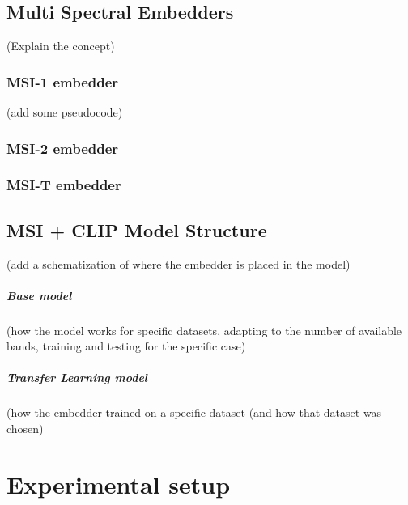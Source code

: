 \documentclass[a4paper, oneside, english]{sapthesis}
\begin{document}
\section{Multi Spectral Embedders}

(Explain the concept)


\subsection{MSI-1 embedder}

(add some pseudocode)

\subsection{MSI-2 embedder}
\subsection{MSI-T embedder}

\section{MSI + CLIP Model Structure}

(add a schematization of where the embedder is placed in the model)

\paragraph{Base model}

(how the model works for specific datasets, adapting to the number of available bands, training and testing for the specific case)

\paragraph{Transfer Learning model}

(how the embedder trained on a specific dataset (and how that dataset was chosen) 

\chapter{Experimental setup} %
\end{document}
